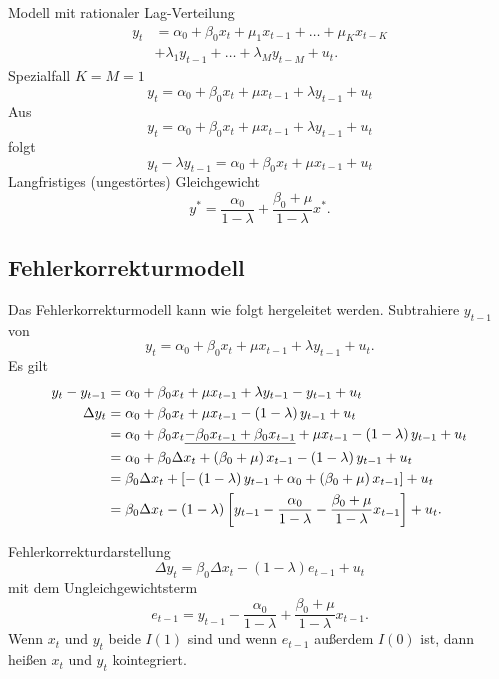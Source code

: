 \documentclass{article}
\begin{document}
Modell mit rationaler Lag-Verteilung
\begin{align*}
y_{t} &=\alpha _{0}+\beta _{0}x_{t}+\mu _{1}x_{t-1}+\ldots +\mu _{K}x_{t-K}\\
&+\lambda _{1}y_{t-1}+\ldots +\lambda _{M}y_{t-M}+u_{t}.
\end{align*}
Spezialfall $K=M=1$
\[ y_{t}=\alpha _{0}+\beta _{0}x_{t}+\mu x_{t-1}+\lambda y_{t-1}+u_{t} \]
Aus
\[ y_{t}=\alpha _{0}+\beta _{0}x_{t}+\mu x_{t-1}+\lambda y_{t-1}+u_{t} \]
folgt
\[ y_{t}-\lambda y_{t-1}=\alpha _{0}+\beta _{0}x_{t}+\mu x_{t-1}+u_{t} \]
Langfristiges (ungestörtes) Gleichgewicht
\[ y^{\ast }=\frac{\alpha _{0}}{1-\lambda }+\frac{\beta _{0}+\mu }{1-\lambda }x^{\ast }. \]

\subsection*{Fehlerkorrekturmodell}

Das Fehlerkorrekturmodell kann wie folgt hergeleitet werden. Subtrahiere
$y_{t-1}$ von
\[ y_{t}=\alpha _{0}+\beta _{0}x_{t}+\mu x_{t-1}+\lambda y_{t-1}+u_{t}.\]
Es gilt
\begin{align*}
y_{t}-y_{t-1} &=\alpha _{0}+\beta _{0}x_{t}+\mu x_{t-1}+\lambda y_{t-1}-y_{t-1}+u_{t} \\
\Delta y_{t} &=\alpha _{0}+\beta _{0}x_{t}+\mu x_{t-1}-\left( 1-\lambda\right) y_{t-1}+u_{t} \\
&=\alpha _{0}+\beta _{0}x_{t}\underline{-\beta _{0}x_{t-1}+\beta _{0}x_{t-1}%
}+\mu x_{t-1}-\left( 1-\lambda \right) y_{t-1}+u_{t} \\
&=\alpha _{0}+\beta _{0}\Delta x_{t}+\left( \beta _{0}+\mu \right)
x_{t-1}-\left( 1-\lambda \right) y_{t-1}+u_{t} \\
&=\beta _{0}\Delta x_{t}+\left[ -\left( 1-\lambda \right) y_{t-1}+\alpha
_{0}+\left( \beta _{0}+\mu \right) x_{t-1}\right] +u_{t} \\
&=\beta _{0}\Delta x_{t}-\left( 1-\lambda \right) \left[ y_{t-1}-\frac{%
	\alpha _{0}}{1-\lambda }-\frac{\beta _{0}+\mu }{1-\lambda }x_{t-1}\right]+u_{t}.
\end{align*}

Fehlerkorrekturdarstellung
\[ \Delta y_{t}=\beta _{0}\Delta x_{t}-\left( 1-\lambda \right) e_{t-1}+u_{t} \]
mit dem Ungleichgewichtsterm
\[ e_{t-1}=y_{t-1}-\frac{\alpha _{0}}{1-\lambda }+\frac{\beta _{0}+\mu }{1-\lambda }x_{t-1}. \]
Wenn $x_{t}$ und $y_{t}$ beide $I(1)$ sind und wenn $e_{t-1}$ außerdem $I(0)$
ist, dann heißen $x_{t}$ und $y_{t}$ kointegriert.
\end{document}
